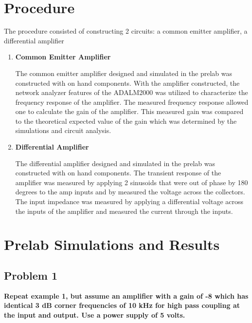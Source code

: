 \documentclass{article}
\begin{document}
\section*{Procedure}
The procedure consisted of constructing 2 circuits: a common emitter amplifier, a
differential amplifier
\begin{enumerate}
  \item \textbf{Common Emitter Amplifier}

  The common emitter amplifier designed and simulated in the prelab was constructed with on hand 
  components. With the amplifier constructed, the network analyzer features of the 
  ADALM2000 was utilized to characterize the frequency response of the amplifier. 
  The measured frequency response allowed one to calculate the gain of the amplifier.
  This measured gain was compared to the theoretical expected value of the gain which
  was determined by the simulations and circuit analysis. 
  \item \textbf{Differential Amplifier}

  The differential amplifier designed and simulated in the prelab was constructed with on hand 
  components. The transient response of the amplifier was measured by applying 2 
  sinusoids that were out of phase by 180 degrees to the amp inputs and by measured the
  voltage across the collectors. The input impedance was measured by applying a 
  differential voltage across the inputs of the amplifier and measured the current 
  through the inputs.
\end{enumerate}

\section*{Prelab Simulations and Results}
\subsection*{Problem 1}
\textbf{
Repeat example 1, but assume an amplifier with a gain of -8 which has identical 3
dB corner frequencies of 10 kHz for high pass coupling at the input and output.
Use a power supply of 5 volts.}
\end{document}

